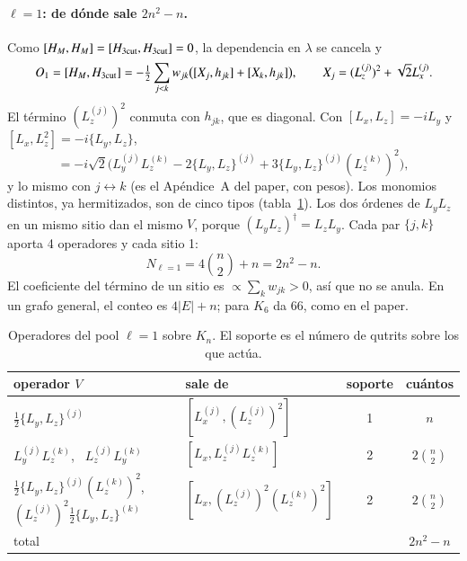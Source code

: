\documentclass[11pt,a4paper]{article}
\begin{document}
\paragraph{$\ell=1$: de dónde sale $2n^2-n$.}
Como $[H_M,H_M]=[H_{\rm 3cut},H_{\rm 3cut}]=0$, la dependencia en $\lambda$ se cancela y
\begin{equation}
  O_1=[H_M,H_{\rm 3cut}]=-\tfrac12\sum_{j<k}w_{jk}\big([X_j,h_{jk}]+[X_k,h_{jk}]\big),
  \qquad X_j=(L_z^{(j)})^2+\sqrt2L_x^{(j)} .
\end{equation}
El término $(L_z^{(j)})^2$ conmuta con $h_{jk}$, que es diagonal. Con $[L_x,L_z]=-iL_y$ y
$[L_x,L_z^2]=-i\{L_y,L_z\}$,
\begin{equation}
  [X_j,h_{jk}]=-i\sqrt2\Big(L_y^{(j)}L_z^{(k)}-2\{L_y,L_z\}^{(j)}
  +3\{L_y,L_z\}^{(j)}(L_z^{(k)})^2\Big),
\end{equation}
y lo mismo con $j\leftrightarrow k$ (es el Apéndice~A del paper, con pesos). Los monomios
distintos, ya hermitizados, son de cinco tipos (tabla~\ref{tab:tiposl1}). Los dos órdenes de
$L_yL_z$ en un mismo sitio dan el mismo $V$, porque $(L_yL_z)^\dagger=L_zL_y$. Cada par $\{j,k\}$
aporta 4 operadores y cada sitio 1:
\begin{equation}
  N_{\ell=1}=4\binom{n}{2}+n=2n^2-n .
\end{equation}
El coeficiente del término de un sitio es $\propto\sum_kw_{jk}>0$, así que no se anula. En un
grafo general, el conteo es $4|E|+n$; para $K_6$ da $66$, como en el paper.

\begin{table}[h]
\centering
\caption{Operadores del pool $\ell=1$ sobre $K_n$. El soporte es el número de qutrits sobre los
que actúa.}
\label{tab:tiposl1}
\small
\begin{tabular}{llcc}
\toprule
operador $V$ & sale de & soporte & cuántos \\
\midrule
$\tfrac12\{L_y,L_z\}^{(j)}$ & $[L_x^{(j)},(L_z^{(j)})^2]$ & 1 & $n$ \\
$L_y^{(j)}L_z^{(k)}$, \ $L_z^{(j)}L_y^{(k)}$ & $[L_x,L_z^{(j)}L_z^{(k)}]$ & 2 & $2\binom n2$ \\
$\tfrac12\{L_y,L_z\}^{(j)}(L_z^{(k)})^2$, \ $(L_z^{(j)})^2\tfrac12\{L_y,L_z\}^{(k)}$ &
  $[L_x,(L_z^{(j)})^2(L_z^{(k)})^2]$ & 2 & $2\binom n2$ \\
\midrule
total & & & $2n^2-n$ \\
\bottomrule
\end{tabular}
\end{table}
\end{document}
